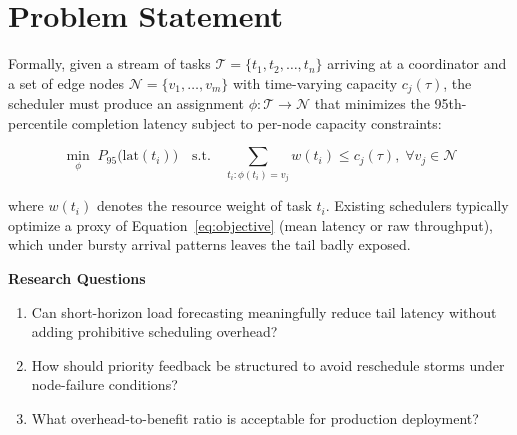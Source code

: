 \section{Problem Statement}

Formally, given a stream of tasks $\mathcal{T} = \{t_1, t_2, \dots, t_n\}$ arriving
at a coordinator and a set of edge nodes $\mathcal{N} = \{v_1, \dots, v_m\}$ with
time-varying capacity $c_j(\tau)$, the scheduler must produce an assignment
$\phi: \mathcal{T} \rightarrow \mathcal{N}$ that minimizes the 95th-percentile
completion latency subject to per-node capacity constraints:

\begin{equation}
\min_{\phi} \; P_{95}\big(\text{lat}(t_i)\big) \quad \text{s.t.} \quad
\sum_{t_i : \phi(t_i) = v_j} w(t_i) \leq c_j(\tau), \; \forall v_j \in \mathcal{N}
\label{eq:objective}
\end{equation}

where $w(t_i)$ denotes the resource weight of task $t_i$. Existing schedulers
typically optimize a proxy of Equation~\ref{eq:objective} (mean latency or raw
throughput), which under bursty arrival patterns leaves the tail badly exposed.

\begin{keyboxblue}
\textbf{\color{yonseiblue}Research Questions}
\begin{enumerate}
  \item Can short-horizon load forecasting meaningfully reduce tail latency
        without adding prohibitive scheduling overhead?
  \item How should priority feedback be structured to avoid reschedule storms
        under node-failure conditions?
  \item What overhead-to-benefit ratio is acceptable for production deployment?
\end{enumerate}
\end{keyboxblue}
